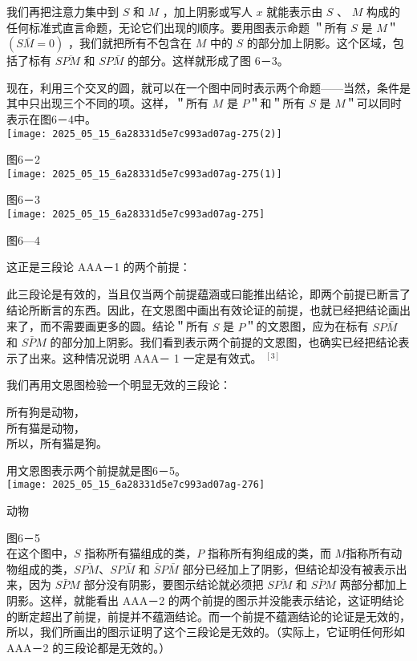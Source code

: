 我们再把注意力集中到 $S$ 和 $M$ ，加上阴影或写人 $x$ 就能表示由 $S$ 、 $M$ 构成的任何标准式直言命题，无论它们出现的顺序。要用图表示命题 ＂所有 $S$ 是 $M$＂$(S \bar{M}=0)$ ，我们就把所有不包含在 $M$ 中的 $S$ 的部分加上阴影。这个区域，包括了标有 $S \overline{P M}$ 和 $S P \bar{M}$ 的部分。这样就形成了图 6－3。

现在，利用三个交叉的圆，就可以在一个图中同时表示两个命题——当然，条件是其中只出现三个不同的项。这样，＂所有 $M$ 是 $P$＂和＂所有 $S$ 是 $M$＂可以同时表示在图6－4中。\\
\texttt{[image: 2025\_05\_15\_6a28331d5e7c993ad07ag-275(2)]}

图6－2\\
\texttt{[image: 2025\_05\_15\_6a28331d5e7c993ad07ag-275(1)]}

图6－3\\
\texttt{[image: 2025\_05\_15\_6a28331d5e7c993ad07ag-275]}

图6—4

这正是三段论 AAA－1 的两个前提：

此三段论是有效的，当且仅当两个前提蕴涵或曰能推出结论，即两个前提已断言了结论所断言的东西。因此，在文恩图中画出有效论证的前提，也就已经把结论画出来了，而不需要画更多的圆。结论＂所有 $S$ 是 $P$＂的文恩图，应为在标有 $S \overline{P \bar{M}}$ 和 $S \bar{P} M$ 的部分加上阴影。我们看到表示两个前提的文恩图，也确实已经把结论表示了出来。这种情况说明 AAA－ 1 一定是有效式。 ${ }^{[3]}$

我们再用文恩图检验一个明显无效的三段论：

所有狗是动物，\\
所有猫是动物，\\
所以，所有猫是狗。

用文恩图表示两个前提就是图6－5。\\
\texttt{[image: 2025\_05\_15\_6a28331d5e7c993ad07ag-276]}

动物

图6－5\\
在这个图中，$S$ 指称所有猫组成的类，$P$ 指称所有狗组成的类，而 $M$指称所有动物组成的类，$S \overline{P M} 、 S P \bar{M}$ 和 $\bar{S} P \bar{M}$ 部分已经加上了阴影，但结论却没有被表示出来，因为 $S \bar{P} M$ 部分没有阴影，要图示结论就必须把 $S \overline{P M}$ 和 $S \bar{P} M$ 两部分都加上阴影。这样，就能看出 AAA－2 的两个前提的图示并没能表示结论，这证明结论的断定超出了前提，前提并不蕴涵结论。而一个前提不蕴涵结论的论证是无效的，所以，我们所画出的图示证明了这个三段论是无效的。（实际上，它证明任何形如 AAA－2 的三段论都是无效的。）

